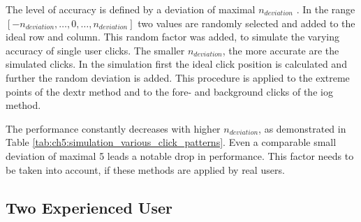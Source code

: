 The level of accuracy is defined by a deviation of maximal $ n_{deviation} $ .
In the range $ \left[-n_{deviation}, \dots, 0, \dots, n_{deviation} \right] $ two values are randomly selected and added to the ideal row and column.
This random factor was added, to simulate the varying accuracy of single user clicks.
The smaller $ n_{deviation} $, the more accurate are the simulated clicks.
In the simulation first the ideal click position is calculated and further the random deviation is added.
This procedure is applied to the extreme points of the \gls{dextr} method and to the fore- and background clicks of the \gls{iog} method.
\begin{table}[h!]
	\centering	
	\caption[Simulations with different click patterns]{
		Simulations of the \gls{dextr} and \gls{iog} method with user clicks, that are simulated with varying degrees of accuracy.
		The parameter $ n_{deviation} $ states the maximal possible deviation from the optimal point, in order to mimic different types of users.
		As expected, the performance decreases with increasing deviation in the simulated user clicks.
	}\label{tab:ch5:simulation_various_click_patterns}
\end{table}

The performance constantly decreases with higher $ n_{deviation} $, as demonstrated in Table \ref{tab:ch5:simulation_various_click_patterns}. 
Even a comparable small deviation of maximal 5  leads a notable drop in performance.
This factor needs to be taken into account, if these methods are applied by real users.


\subsection{Two Experienced User}\label{ord:ch5:sec3:subsec3}

